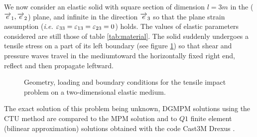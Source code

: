 We now consider an elastic solid with square section of dimension $l=3m$ in the (${\overrightarrow{e}}_1,{\overrightarrow{e}}_2$) plane, and infinite in the direction ${\overrightarrow{e}}_3$ so that the plane strain assumption (\textit{i.e. $\varepsilon_{33}=\varepsilon_{13}=\varepsilon_{23}=0$}) holds. The values of elastic parameters considered are still those of table \ref{tab:material}. The solid suddenly undergoes a tensile stress on a part of its left boundary (see figure \ref{fig:2D_planeStrain}) so that shear and pressure waves travel in the mediumtoward the horizontally fixed right end, reflect and then propagate leftward.
\begin{figure}[h!]
  \centering
   \qquad
  \caption{Geometry, loading and boundary conditions for the tensile impact problem on a two-dimensional elastic medium.}
  \label{fig:2D_planeStrain}
\end{figure}
The exact solution of this problem being unknown, DGMPM solutions using the CTU method are compared to the MPM solution and to $Q1$ finite element (bilinear approximation) solutions obtained with the code Cast3M Drexus \cite{Castem}.

